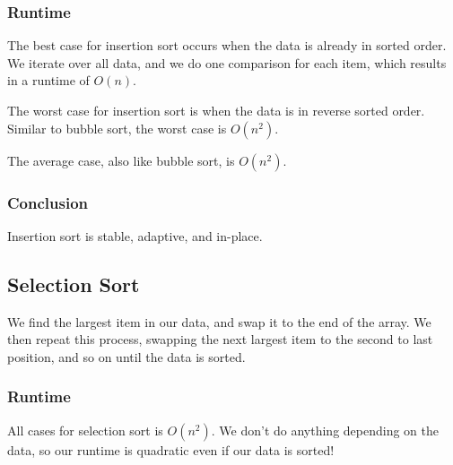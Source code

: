 \subsubsection{Runtime}
The best case for insertion sort occurs when the data is already in sorted order. We iterate over all data, and we do one comparison for each item, which results in a runtime of \( O(n) \).

The worst case for insertion sort is when the data is in reverse sorted order. Similar to bubble sort, the worst case is \( O(n^2) \).

The average case, also like bubble sort, is \( O(n^2) \).

\subsubsection{Conclusion}
Insertion sort is stable, adaptive, and in-place.

\subsection{Selection Sort}
We find the largest item in our data, and swap it to the end of the array. We then repeat this process, swapping the next largest item to the second to last position, and so on until the data is sorted.

\subsubsection{Runtime}
All cases for selection sort is \( O(n^2) \). We don't do anything depending on the data, so our runtime is quadratic even if our data is sorted!
